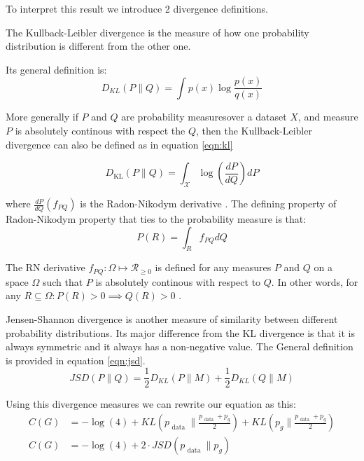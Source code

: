 To interpret this result we introduce 2 divergence definitions.
\begin{definition}
    The Kullback-Leibler divergence is the measure of how one probability distribution is different from
    the other one.   
\end{definition}
Its general definition is:
\begin{equation}
    D_{K L}(P \| Q)=\int p(x) \log \frac{p(x)}{q(x)}
\end{equation}

More generally if $P$ and $Q$ are probability measures\footnotemark  over a dataset $X$, and measure
$P$ is absolutely continous with respect the $Q$, then the Kullback-Leibler divergence can also be
defined as in equation \ref{eqn:kl}

\begin{equation}
    \label{eqn:kl}
    D_{\mathrm{KL}}(P \| Q)=\int_{\mathcal{X}} \log \left(\frac{d P}{d Q}\right) d P
\end{equation}

where $\frac{d P}{dQ} (f_{PQ})$ is the Radon-Nikodym derivative \cite{Bill86}. The defining property of
Radon-Nikodym property that ties to the probability measure is that:
\begin{equation}
    \label{eqn:radon}
    P(R) = \int_{R} f_{PQ} d Q
\end{equation}

The RN derivative $f_{PQ} : \Omega \mapsto \mathcal{R}_{\geq 0}$ is defined for any measures $P$ and
$Q$ on a space $\Omega$ such that $P$ is absolutely continous with respect to $Q$. In other words,
for any $ R \subseteq  \Omega : P(R) > 0 \implies Q(R) > 0$ . \cite{Bill86}

Jensen-Shannon divergence is another measure of similarity between different probability
distributions.  Its major difference from the KL divergence is that it is always symmetric and it
always has a non-negative value. The General definition is provided in equation \ref{eqn:jsd}.
\begin{equation}
    \label{eqn:jsd}
    J S D(P \| Q)=\frac{1}{2} D_{K L}(P \| M)+\frac{1}{2} D_{K L}(Q \| M)
\end{equation}

Using this divergence measures we can rewrite our equation as this:
\begin{align}
    \label{eqn:gan_eqaul}
    C(G)&=-\log (4)+K L\left(p_{\text { data }} \| \frac{p_{\text { data }}+p_{g}}{2}\right)+K L\left(p_{g} \| \frac{p_{\text { data }}+p_{g}}{2}\right) \\
    C(G)&=-\log (4)+2 \cdot J S D\left(p_{\text { data }} \| p_{g}\right)
\end{align}

